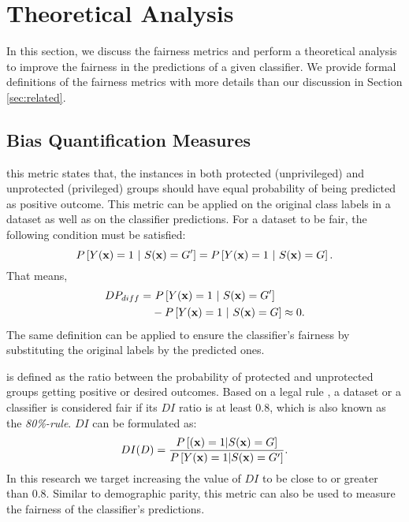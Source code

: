 
\section{Theoretical Analysis}
\label{sec:theory}

In this section, we discuss the fairness metrics and perform a theoretical analysis to improve the fairness in the predictions of a given classifier. We provide formal definitions of the fairness metrics with more details than our discussion in Section \ref{sec:related}. 

\subsection{Bias Quantification Measures}

 this metric states that, the instances in both protected (unprivileged) and unprotected (privileged) groups should have equal probability of being predicted as positive outcome. This metric can be applied on the original class labels in a dataset as well as on the classifier predictions. For a dataset to be fair, the following condition must be satisfied:
\[P\left[Y({\bf x})=1\ |\ S({\bf x})=G' \right]  = P\left[Y({\bf x})=1\ |\ S({\bf x}) = G \right].\] That means, 
\begin{align} \label{eq:DPDiff}
\begin{split}
DP_{diff} = &\ P\left[Y({\bf x})=1\ |\ S({\bf x})=G' \right]
    \\& - P\left[ {Y({\bf x})}=1\ |\ S({\bf x}) = G \right] \approx 0.
\end{split}
\end{align}
The same definition can be applied to ensure the classifier's fairness by substituting the original labels by the predicted ones.%

 is defined as the ratio between the probability of protected and unprotected groups getting positive or desired outcomes. Based on a legal rule \cite{US_guideline}, a dataset or a classifier is considered fair if its $DI$ ratio is at least 0.8, which is also known as the \emph{80\%-rule}. $DI$ can be formulated as:
\begin{equation}\label{eq:di}
DI(D) = \frac{ P\left[({\bf x}) = 1 | S({\bf x}) = G\right]} {P\left[Y({\bf x}) = 1 | S({\bf x})=G'\right]}.
\end{equation}
In this research we target increasing the value of $DI$ to be close to or greater than $0.8$. Similar to demographic parity, this metric can also be used to measure the fairness of the classifier's predictions.


